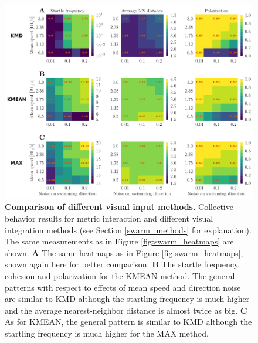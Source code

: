     \begin{figure}[H]
    \begin{center}
    \includegraphics[width=\textwidth]{looming_swarm_fixed_rhonull_int_type_matrix_comparison_new.pdf}
    \end{center}
    \caption{\textbf{Comparison of different visual input methods.} Collective behavior results for metric interaction and different visual integration methods (see Section \ref{swarm_methods} for explanation). The same measurements as in Figure \ref{fig:swarm_heatmaps} are shown. \textbf{A} The same heatmaps as in Figure \ref{fig:swarm_heatmaps}, shown again here for better comparison. \textbf{B} The startle frequency, cohesion and polarization for the KMEAN method. The general patterns with respect to effects of mean speed and direction noise are similar to KMD although the startling frequency is much higher and the average nearest-neighbor distance is almost twice as big. \textbf{C} As for KMEAN, the general pattern is similar to KMD although the startling frequency is much higher for the MAX method.}
    \label{fig:swarm_comparison}
    \end{figure}
